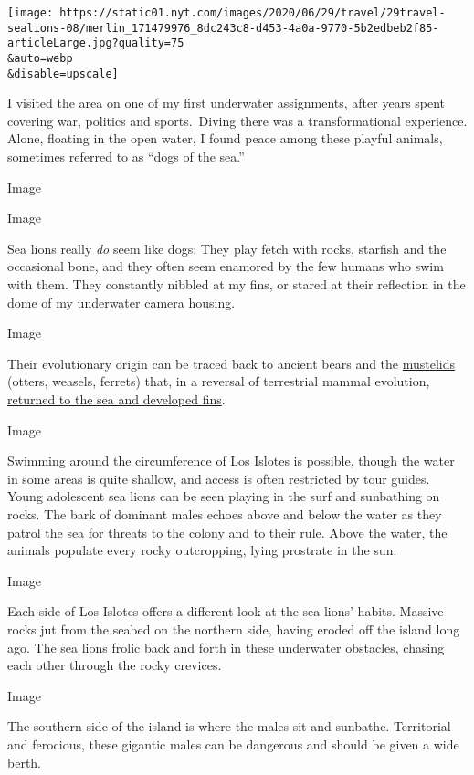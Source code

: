 \texttt{[image: https://static01.nyt.com/images/2020/06/29/travel/29travel-sealions-08/merlin\_171479976\_8dc243c8-d453-4a0a-9770-5b2edbeb2f85-articleLarge.jpg?quality=75\\\&auto=webp\\\&disable=upscale]}

I visited the area on one of my first underwater assignments, after
years spent covering war, politics and sports.~Diving there was a
transformational experience. Alone, floating in the open water, I found
peace among these playful animals, sometimes referred to as ``dogs of
the sea.''

Image

Image

Sea lions really \emph{do} seem like dogs: They play fetch with rocks,
starfish and the occasional bone, and they often seem enamored by the
few humans who swim with them. They constantly nibbled at my fins, or
stared at their reflection in the dome of my underwater camera housing.

Image

Their evolutionary origin can be traced back to ancient bears and the
\href{https://www.britannica.com/animal/mustelid}{mustelids} (otters,
weasels, ferrets) that, in a reversal of terrestrial mammal evolution,
\href{https://www.nationalgeographic.com/science/phenomena/2009/04/22/puijila-the-walking-seal-a-beautiful-transitional-fossil/}{returned
to the sea and developed fins}.

Image

Swimming around the circumference of Los Islotes is possible, though the
water in some areas is quite shallow, and access is often restricted by
tour guides. Young adolescent sea lions can be seen playing in the surf
and sunbathing on rocks. The bark of dominant males echoes above and
below the water as they patrol the sea for threats to the colony and to
their rule. Above the water, the animals populate every rocky
outcropping, lying prostrate in the sun.

Image

Each side of Los Islotes offers a different look at the sea lions'
habits. Massive rocks jut from the seabed on the northern side, having
eroded off the island long ago. The sea lions frolic back and forth in
these underwater obstacles, chasing each other through the rocky
crevices.

Image

The southern side of the island is where the males sit and sunbathe.
Territorial and ferocious, these gigantic males can be dangerous and
should be given a wide berth.

